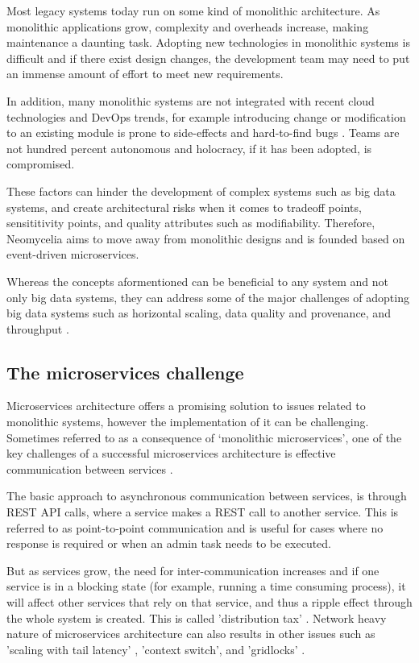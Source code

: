 \documentclass[10pt, conference]{IEEEtran}
\begin{document}
Most legacy systems today run on some kind of monolithic architecture. As monolithic applications grow, complexity and overheads increase, making maintenance a daunting task. Adopting new technologies in monolithic systems is difficult and if there exist design changes, the development team may need to put an immense amount of effort to meet new requirements.

In addition, many monolithic systems are not integrated with recent cloud technologies and DevOps trends, for example introducing change or modification to an existing module is prone to side-effects and hard-to-find bugs \cite{Bass,Fritzsch}. Teams are not hundred percent autonomous and holocracy, if it has been adopted, is compromised.

These factors can hinder the development of complex systems such as big data systems, and create architectural risks when it comes to tradeoff points, sensititivity points, and quality attributes such as modifiability. Therefore, Neomycelia aims to move away from monolithic designs and is founded based on event-driven microservices.

Whereas the concepts aformentioned can be beneficial to any system and not only big data systems, they can address some of the major challenges of adopting big data systems such as horizontal scaling, data quality and provenance, and throughput \cite{sivarajah2017critical}.

\subsection{The microservices challenge}

Microservices architecture offers a promising solution to issues related to monolithic systems, however the implementation of it can be challenging. Sometimes referred to as a consequence of ‘monolithic microservices’, one of the key challenges of a successful microservices architecture is effective communication between services \cite{Munaf}.

The basic approach to asynchronous communication between services, is through REST API calls, where a service makes a REST call to another service. This is referred to as point-to-point communication and is useful for cases where no response is required or when an admin task needs to be executed.

But as services grow, the need for inter-communication increases and if one service is in a blocking state (for example, running a time consuming process), it will affect other services that rely on that service, and thus a ripple effect through the whole system is created. This is called 'distribution tax' \cite{montesi2016circuit}. Network heavy nature of microservices architecture can also results in other issues such as 'scaling with tail latency' , 'context switch', and 'gridlocks' \cite{sriraman2018mu}\cite{gan2019open}\cite{kakivaya2018service}.
\end{document}
